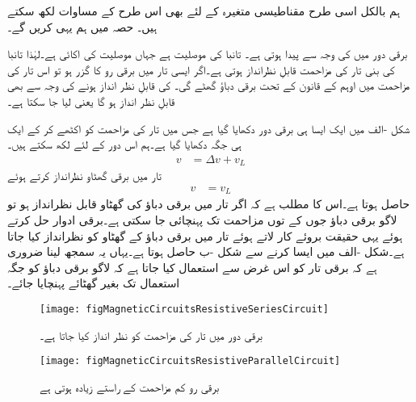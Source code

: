 	ہم بالکل اسی طرح مقناطیسی متغیرہ کے لئے بھی اس طرح کے مساوات لکھ سکتے ہیں۔ حصہ   میں ہم یہی کریں گے۔

	برقی دور میں     کی وجہ سے    پیدا ہوتی ہے۔ تانبا   کی موصلیت  ہے جہاں  موصلیت کی اکائی ہے۔لہٰذا تانبا کی بنی تار کی مزاحمت    قابلِ نظرانداز ہوتی ہے۔اگر ایسی تار میں برقی رو  کا گزر ہو  تو اس تار کی مزاحمت میں اوہم کے قانون کے تحت  برقی دباؤ   گھٹے  گی۔ کی قابلِ نظر انداز ہونے کی وجہ سے  بھی قابلِ نظر انداز ہو گا یعنی  لیا جا سکتا ہے۔ 

شکل -الف میں ایک ایسا ہی برقی دور دکھایا گیا ہے جس  میں تار کی مزاحمت کو اکٹھے کر کے ایک ہی جگہ   دکھایا گیا ہے۔ہم  اس دور کے لئے لکھ سکتے ہیں۔
\begin{align}
v&=\Delta v+v_L
\end{align}
تار میں برقی گھٹاو  نظرانداز کرتے ہوئے
\begin{align}
v&=v_L
\end{align}
حاصل ہوتا ہے۔اس کا مطلب ہے کہ اگر تار میں برقی دباؤ کی گھٹاو قابل نظرانداز ہو تو لاگو برقی دباؤ جوں کے توں مزاحمت  تک پہنچائی جا سکتی ہے۔برقی ادوار حل کرتے ہوئے یہی حقیقت بروئے کار لاتے ہوئے تار میں برقی دباؤ کے گھٹاو کو نظرانداز کیا جاتا ہے۔شکل -الف میں ایسا کرنے سے  شکل -ب حاصل ہوتا ہے۔یہاں یہ سمجھ لینا ضروری ہے کہ برقی تار کو اس غرض سے استعمال کیا جاتا ہے کہ لاگو برقی دباؤ کو جگہ استعمال تک بغیر گھٹائے پہنچایا جائے۔
\begin{figure}
\centering
\texttt{[image: figMagneticCircuitsResistiveSeriesCircuit]}
\caption{برقی دور میں تار کی مزاحمت کو نظر انداز کیا جاتا ہے۔}
\label{شکل_مقناطیسی_دور_سلسہ_وار_مزاحمتی_ادوار}
\end{figure}
\begin{figure}
\centering
\texttt{[image: figMagneticCircuitsResistiveParallelCircuit]}
\caption{برقی رو کم مزاحمت کے راستے  زیادہ ہوتی ہے}
\label{شکل_مقناطیسی_دور_متوازی_مزاحمتی_دور}
\end{figure}
%

